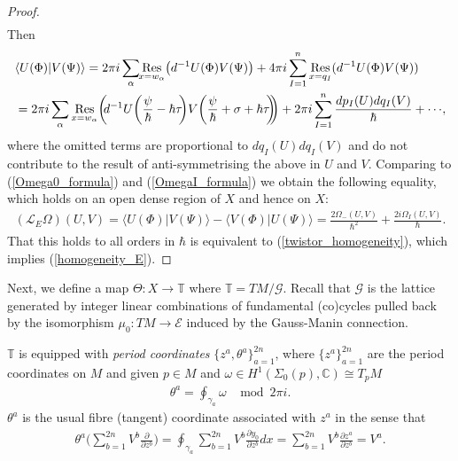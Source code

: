 \documentclass[a4paper,12pt,reqno]{amsart}
\numberwithin{equation}{section}
\numberwithin{counter2}{section}
\begin{document}
\begin{proof}
\begin{align}
\end{align}
Then
\begin{align}
&\langle U(\Phi) | V(\Psi) \rangle  = 2\pi i \sum_{\alpha} \hspace{-1mm} \underset{x=w_\alpha}{\text{Res}} \big( d^{-1} U(\Phi) V(\Psi)\big) + 4 \pi i \sum_{I = 1}^n  \underset{x=q_I}{\text{Res}} ( d^{-1} U(\Phi)  V(\Psi)) \nonumber \\ &= 2\pi i \sum_{\alpha} \underset{x=w_\alpha}{\mathrm{Res}} \bigg( \hspace{-1mm} d^{-1}U\bigg(\frac{\psi}{\hbar} - \hbar\tau \hspace{-1mm} \bigg) V\bigg(\frac{\psi}{\hbar} + \sigma + \hbar\tau \hspace{-1mm}  \bigg)  \hspace{-1.5mm} \bigg) + 2\pi i \sum_{I=1}^n  \frac{dp_I(U)dq_I(V)}{\hbar}  + \cdots \hspace{-0.5mm} ,   
\end{align}
where the omitted terms are proportional to $dq_I(U)dq_I(V)$ and do not contribute to the result of anti-symmetrising the above in $U$ and $V$.  Comparing to (\ref{Omega0_formula}) and (\ref{OmegaI_formula}) we obtain the following equality,  which holds on an open dense region of $X$ and hence on $X$:
\begin{align}\label{twistor_homogeneity_h}
(\mathcal{L}_E\Omega)(U,V) = \langle U(\Phi) | V(\Psi) \rangle - \langle V(\Phi) | U(\Psi) \rangle = \frac{2\Omega_{-}(U,V)}{\hbar^2} + \frac{2i\Omega_{I}(U,V)}{\hbar}.
\end{align}
That this holds to all orders in $\hbar$ is equivalent to (\ref{twistor_homogeneity}),  which implies (\ref{homogeneity_E}). 
\end{proof}
Next,  we define a map $\Theta: X \to \mathbb{T}$ where $\mathbb{T} = TM / \mathcal{G}$.  Recall that $\mathcal{G}$ is the lattice generated by integer linear combinations of fundamental (co)cycles pulled back by the isomorphism $\mu_0: TM \to \mathcal{E}$ induced by the Gauss-Manin connection. \par
$\mathbb{T}$ is equipped with \textit{period coordinates} $\{z^{a},\theta^{a}\}_{a=1}^{2n}$, where $\{z^a\}_{a=1}^{2n}$ are the period coordinates on $M$ and given $p \in M$ and $\omega \in H^1(\Sigma_0(p),\mathbb{C}) \cong T_pM$ 
\begin{align}
\theta^{a} = \oint_{\gamma_{a}} \omega \ \,  \mod 2\pi i.  
\end{align}
$\theta^{a}$ is the usual fibre (tangent) coordinate associated with $z^{a}$ in the sense that
\begin{align}
\theta^{a} \Bigg( \sum_{b=1}^{2n}V^b\frac{\partial}{\partial z^{b}}\Bigg) = \oint_{\gamma_{a}} \sum_{b=1}^{2n} V^b \frac{\partial y_0}{\partial z^b} dx = \sum_{b=1}^{2n} V^b\frac{\partial z^a}{\partial z^b} = V^a.  
\end{align}
\end{document}
